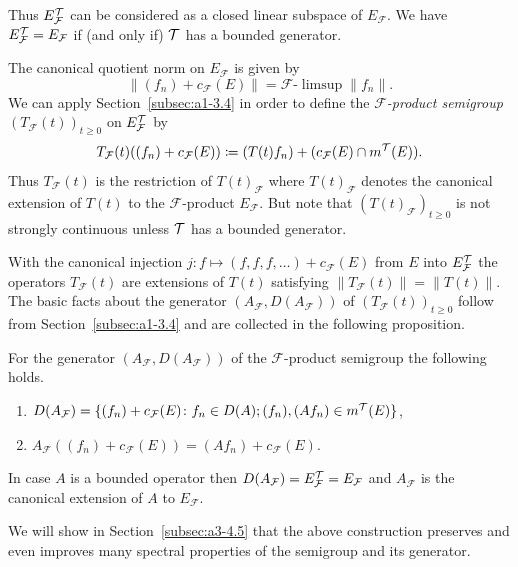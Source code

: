 Thus $E_{\mathcal{F}}^{\mathcal{T}}$ can be considered as a closed linear subspace of\/ $E_{\mathcal{F}}$. 
We have $E_{\mathcal{F}}^{\mathcal{T}} = E_{\mathcal{F}}$ if (and only if) $\mathcal{T}$ has a bounded generator.

The canonical quotient norm on $E_{\mathcal{F}}$ is given by
\[
    \|(f_{n}) + c_{\mathcal{F}}(E)\| = \mathcal{F}\text{-}\limsup \|f_{n}\| .
\]
We can apply Section~\ref{subsec:a1-3.4} in order to define the \emph{$\mathcal{F}$-product semigroup} $(T_{\mathcal{F}}(t))_{t \geq 0}$ on $E_{\mathcal{F}}^{\mathcal{T}}$ by
\[
    T_{\mathcal{F}}(t)((f_{n}) + c_{\mathcal{F}}(E)) \coloneq (T(t)f_{n}) 
    	+ ( c_{\mathcal{F}}(E)\cap m^{\mathcal{T}}(E) ) .
\]
Thus $T_{\mathcal{F}}(t)$ is the restriction of\/ $T(t)_{\mathcal{F}}$ where $T(t)_{\mathcal{F}}$ denotes the canonical extension of\/ $T(t)$ to the $\mathcal{F}$-product $E_{\mathcal{F}}$. 
But note that $(T(t)_{\mathcal{F}})_{t \geq 0}$ is not strongly continuous unless $\mathcal{T}$ has a bounded generator.

With the canonical injection $j \colon f \mapsto (f,f,f,\ldots) + c_{\mathcal{F}}(E)$ from $E$ into 
$E_{\mathcal{F}}^{\mathcal{T}}$ the operators $T_{\mathcal{F}}(t)$ are extensions of\/ $T(t)$ satisfying $\|T_{\mathcal{F}}(t)\| = \|T(t)\|$. 
The basic facts about the generator $(A_{\mathcal{F}},D(A_{\mathcal{F}}))$ of\/ $(T_{\mathcal{F}}(t))_{t \geq 0}$ follow from Section~\ref{subsec:a1-3.4} and are collected in the following proposition.
\begin{proposition*}\label{prop:a1-3.6}
For the generator $(A_{\mathcal{F}},D(A_{\mathcal{F}}))$ of the $\mathcal{F}$-product semigroup the following holds.
\begin{enumerate}[\upshape(i)]
\item 
$D(A_{\mathcal{F}}) = \{(f_{n}) + c_{\mathcal{F}}(E) \colon f_{n} \in D(A); (f_{n}), (Af_{n}) \in m^{\mathcal{T}}(E)\}$,

\item 
$A_{\mathcal{F}}((f_{n}) + c_{\mathcal{F}}(E)) = (Af_{n}) + c_{\mathcal{F}}(E)$.

\end{enumerate}
\end{proposition*}
In case $A$ is a bounded operator then $D(A_{\mathcal{F}}) = E_{\mathcal{F}}^{\mathcal{T}} = E_{\mathcal{F}}$ and $A_{\mathcal{F}}$ is the canonical extension of\/ $A$ to $E_{\mathcal{F}}$.

We will show in Section~\ref{subsec:a3-4.5} that the above construction preserves and even improves many spectral properties of the semigroup and its generator.
